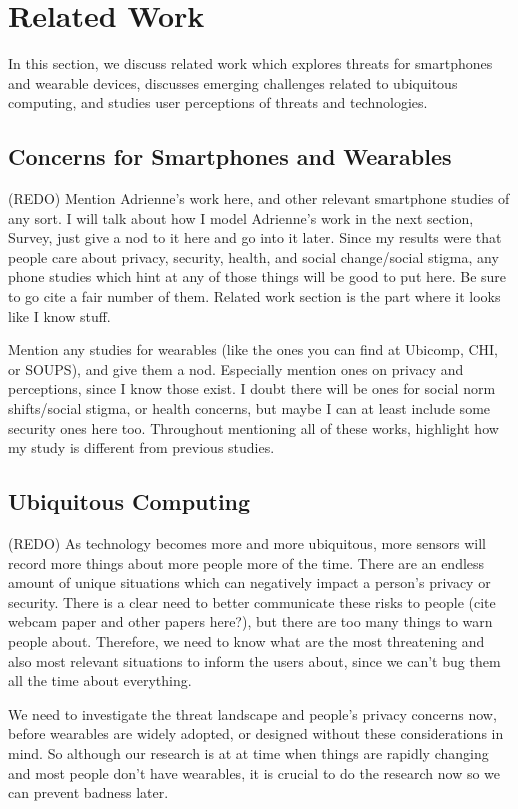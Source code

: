 \documentclass{acm_proc_article-sp}
\begin{document}

\section{Related Work}
In this section, we discuss related work which explores threats for smartphones and wearable devices, discusses emerging challenges related to ubiquitous computing, and studies user perceptions of threats and technologies. 

\subsection{Concerns for Smartphones and Wearables}
(REDO) Mention Adrienne's work here, and other relevant smartphone studies of any sort. I will talk about how I model Adrienne's work in the next section, Survey, just give a nod to it here and go into it later. Since my results were that people care about privacy, security, health, and social change/social stigma, any phone studies which hint at any of those things will be good to put here. Be sure to go cite a fair number of them. Related work section is the part where it looks like I know stuff. 

Mention any studies for wearables (like the ones you can find at Ubicomp, CHI, or SOUPS), and give them a nod. Especially mention ones on privacy and perceptions, since I know those exist. I doubt there will be ones for social norm shifts/social stigma, or health concerns, but maybe I can at least include some security ones here too. Throughout mentioning all of these works, highlight how my study is different from previous studies. 

\subsection{Ubiquitous Computing}
(REDO) As technology becomes more and more ubiquitous, more sensors will record more things about more people more of the time. There are an endless amount of unique situations which can negatively impact a person's privacy or security. There is a clear need to better communicate these risks to people (cite webcam paper and other papers here?), but there are too many things to warn people about. Therefore, we need to know what are the most threatening and also most relevant situations to inform the users about, since we can't bug them all the time about everything. 

We need to investigate the threat landscape and people's privacy concerns now, before wearables are widely adopted, or designed without these considerations in mind. So although our research is at at time when things are rapidly changing and most people don't have wearables, it is crucial to do the research now so we can prevent badness later.
\end{document}
